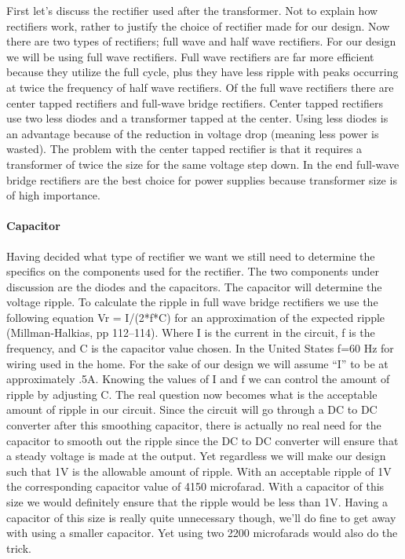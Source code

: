First let{}'s discuss the rectifier used after the transformer. Not to explain
how rectifiers work, rather to justify the choice of rectifier made for our
design. Now there are two types of rectifiers; full wave and half wave
rectifiers.  For our design we will be using full wave rectifiers. Full wave
rectifiers are far more efficient because they utilize the full cycle, plus
they have less ripple with peaks occurring at twice the frequency of half wave
rectifiers. Of the full wave rectifiers there are center tapped rectifiers and
full{}-wave bridge rectifiers. Center tapped rectifiers use two less diodes and
a transformer tapped at the center. Using less diodes is an advantage because
of the reduction in voltage drop (meaning less power is wasted). The problem
with the center tapped rectifier is that it requires a transformer of twice the
size for the same voltage step down. In the end full{}-wave bridge rectifiers
are the best choice for power supplies because transformer size is of high
importance.

\paragraph{Capacitor}

Having decided what type of rectifier we want we still need to determine the
specifics on the components used for the rectifier. The two components under
discussion are the diodes and the capacitors. The capacitor will determine the
voltage ripple. To calculate the ripple in full wave bridge rectifiers we use
the following equation Vr = I/(2*f*C) for an approximation of the expected
ripple (Millman{}-Halkias, pp 112--114). Where I is the current in the circuit,
f is the frequency, and C is the capacitor value chosen. In the United States
f=60 Hz for wiring used in the home. For the sake of our design we will assume
{}``I{}'' to be at approximately .5A. Knowing the values of I and f we can
control the amount of ripple by adjusting C. The real question now becomes what
is the acceptable amount of ripple in our circuit. Since the circuit will go
through a DC to DC converter after this smoothing capacitor, there is actually
no real need for the capacitor to smooth out the ripple since the DC to DC
converter will ensure that a steady voltage is made at the output. Yet
regardless we will make our design such that 1V is the allowable amount of
ripple. With an acceptable ripple of 1V the corresponding capacitor value of
4150 microfarad. With a capacitor of this size we would definitely ensure that
the ripple would be less than 1V. Having a capacitor of this size is really
quite unnecessary though, we{}'ll do fine to get away with using a smaller
capacitor. Yet using two 2200 microfarads would also do the trick.

